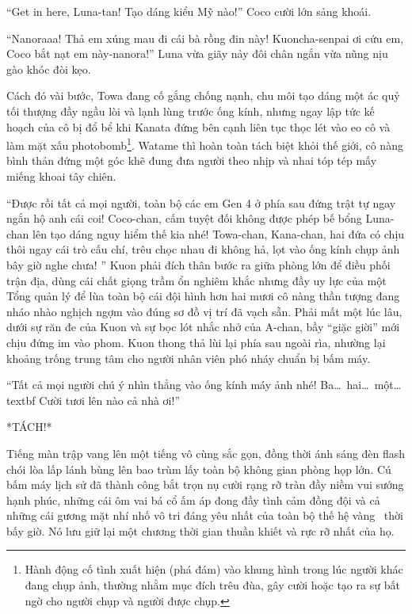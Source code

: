 \documentclass[../main.tex]{subfiles}
\begin{document}
``Get in here, Luna-tan! Tạo dáng kiểu Mỹ nào!'' Coco cười lớn sảng khoái.

``Nanoraaa! Thả em xúng mau đi cái bà rồng đin này! Kuoncha-senpai ơi cứu em, Coco bắt nạt em này-nanora!'' Luna vừa giãy nảy đôi chân ngắn vừa nũng nịu gào khóc đòi kẹo.

Cách đó vài bước, Towa đang cố gắng chống nạnh, chu môi tạo dáng một ác quỷ tối thượng đầy ngầu lòi và lạnh lùng trước ống kính, nhưng ngay lập tức kế hoạch của cô bị đổ bể khi Kanata đứng bên cạnh liên tục thọc lét vào eo cô và làm mặt xấu photobomb\footnote{Hành động cố tình xuất hiện (phá đám) vào khung hình trong lúc người khác đang chụp ảnh, thường nhằm mục đích trêu đùa, gây cười hoặc tạo ra sự bất ngờ cho người chụp và người được chụp.}. Watame thì hoàn toàn tách biệt khỏi thế giới, cô nàng bình thản đứng một góc khẽ đung đưa người theo nhịp và nhai tóp tép mấy miếng khoai tây chiên.

``Được rồi tất cả mọi người, toàn bộ các em Gen 4 ở phía sau đứng trật tự ngay ngắn hộ anh cái coi! Coco-chan, cấm tuyệt đối không được phép bế bổng Luna-chan lên tạo dáng nguy hiểm thế kia nhé! Towa-chan, Kana-chan, hai đứa có chịu thôi ngay cái trò cấu chí, trêu chọc nhau đi không hả, lọt vào ống kính chụp ảnh bây giờ nghe chưa! '' Kuon phải đích thân bước ra giữa phòng lớn để điều phối trận địa, dùng cái chất giọng trầm ổn nghiêm khắc nhưng đầy uy lực của một Tổng quản lý để lùa toàn bộ cái đội hình hơn hai mươi cô nàng thần tượng đang nháo nhào nghịch ngợm vào đúng sơ đồ vị trí đã vạch sẵn. Phải mất một lúc lâu, dưới sự răn đe của Kuon và sự bọc lót nhắc nhở của A-chan, bầy ``giặc giời'' mới chịu đứng im vào phom. Kuon thong thả lùi lại phía sau ngoài rìa, nhường lại khoảng trống trung tâm cho người nhân viên phó nháy chuẩn bị bấm máy.

``Tất cả mọi người chú ý nhìn thẳng vào ống kính máy ảnh nhé! Ba\dots\ hai\dots\ một\dots\\textbf{ Cười tươi lên nào cả nhà ơi!}''

*TÁCH!*

Tiếng màn trập vang lên một tiếng vô cùng sắc gọn, đồng thời ánh sáng đèn flash chói lòa lấp lánh bùng lên bao trùm lấy toàn bộ không gian phòng họp lớn. Cú bấm máy lịch sử đã thành công bắt trọn nụ cười rạng rỡ tràn đầy niềm vui sướng hạnh phúc, những cái ôm vai bá cổ ấm áp đong đầy tình cảm đồng đội và cả những cái gương mặt nhí nhố vô tri đáng yêu nhất của toàn bộ thế hệ vàng \hll\ thời bấy giờ. Nó lưu giữ lại một chương thời gian thuần khiết và rực rỡ nhất của họ.
\end{document}
